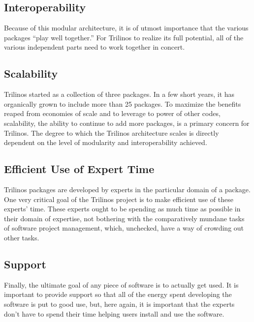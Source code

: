 \documentclass[12pt,relax]{article}
\begin{document}
\subsection{Interoperability}
Because of this modular architecture, it is of utmost importance that the
various packages ``play well together.''  For Trilinos to realize its full
potential, all of the various independent parts need to work together in
concert.

\subsection{Scalability}
Trilinos started as a collection of three packages.  In a few short years, it
has organically grown to include more than 25 packages.  To maximize the
benefits reaped from economies of scale and to leverage to power of other
codes, scalability, the ability to continue to add more packages, is a primary
concern for Trilinos.  The degree to which the Trilinos architecture scales
is directly dependent on the level of modularity and interoperability achieved.

\subsection{Efficient Use of Expert Time}
Trilinos packages are developed by experts in the particular domain of a
package.  One very critical goal of the Trilinos project is to make efficient
use of these experts' time.  These experts ought to be spending as much time as
possible in their domain of expertise, not bothering with the comparatively
mundane tasks of software project management, which, unchecked, have a way of
crowding out other tasks.

\subsection{Support}
Finally, the ultimate goal of any piece of software is to actually get used.  
It is important to provide support so that all of the energy spent developing
the software is put to good use, but, here again, it is important that the
experts don't have to spend their time helping users install and use the
software.

\clearpage

\end{document}
